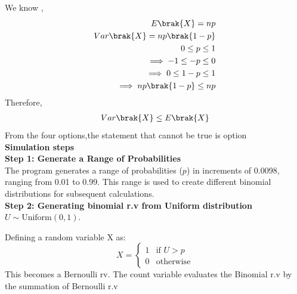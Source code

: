 \documentclass[journal,12pt,twocolumn]{IEEEtran}
\begin{document}
We know ,
\begin{align} 
	E\brak{X}=np\\
	Var\brak{X}=np\brak{1-p}\\
	0\leq p\leq1 \\
	\implies -1\leq -p \leq0\\
	\implies
	0 \leq 1-p \leq1\\
	\implies np\brak{1-p}\leq np
\end{align}
Therefore,
\begin{align} 
	Var\brak{X}\leq E\brak{X}
\end{align}
From the four options,the statement that cannot be true is option \\

\textbf{Simulation steps}\\
\textbf{Step 1: Generate a Range of Probabilities}\\
The program generates a range of probabilities (\(p\)) in increments of 0.0098, ranging from 0.01 to 0.99. This range is used to create different binomial distributions for subsequent calculations.
\\
\textbf{Step 2: Generating binomial r.v from Uniform distribution}\\
\( U \sim \text{Uniform}(0, 1) \).

Defining a random variable X as:
\[
X = 
\begin{cases}
    1 & \text{if } U > p \\
    0 & \text{otherwise}
\end{cases}
\]
This becomes a Bernoulli rv.
The count variable evaluates the Binomial r.v by the summation of Bernoulli r.v
\end{document}
